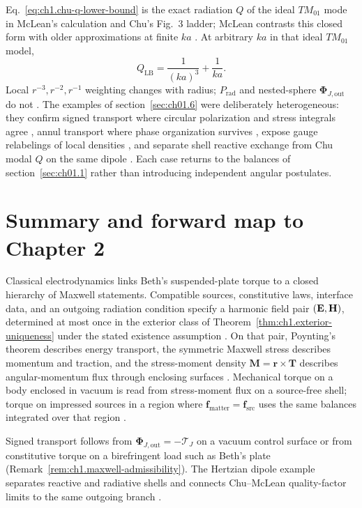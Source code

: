 Eq.~\eqref{eq:ch1.chu-q-lower-bound} is the exact radiation $Q$ of the ideal $TM_{01}$ mode in McLean's calculation and Chu's Fig.~3 ladder; McLean contrasts this closed form with older approximations at finite $ka$ \cite{mcclean1996,chu1948}. At arbitrary $ka$ in that ideal $TM_{01}$ model,
\begin{equation}
\label{eq:ch1.chu-q-lower-bound}
Q_{\mathrm{LB}}=\frac{1}{(ka)^3}+\frac{1}{ka}.
\end{equation}
Local $r^{-3},r^{-2},r^{-1}$ weighting changes with radius; $P_{\mathrm{rad}}$ and nested-sphere $\boldsymbol{\Phi}_{J,\mathrm{out}}$ do not \cite{poynting1884,stratton1941}. The examples of section~\ref{sec:ch01.6} were deliberately heterogeneous: they confirm signed transport where circular polarization and stress integrals agree \cite{beth1936}, annul transport where phase organization survives \cite{allen1992}, expose gauge relabelings of local densities \cite{belinfante1940}, and separate shell reactive exchange from Chu modal $Q$ on the same dipole \cite{chu1948,mcclean1996}. Each case returns to the balances of section~\ref{sec:ch01.1} rather than introducing independent angular postulates.

\section{Summary and forward map to Chapter 2}
\label{sec:ch01.7}

Classical electrodynamics links Beth's suspended-plate torque to a closed hierarchy of Maxwell statements. Compatible sources, constitutive laws, interface data, and an outgoing radiation condition specify a harmonic field pair $(\mathbf{E},\mathbf{H})$, determined at most once in the exterior class of Theorem~\ref{thm:ch1.exterior-uniqueness} under the stated existence assumption \cite{maxwell1873,stratton1941,sommerfeld1949}. On that pair, Poynting's theorem describes energy transport, the symmetric Maxwell stress describes momentum and traction, and the stress-moment density $\mathbf{M}=\mathbf{r}\times\mathbf{T}$ describes angular-momentum flux through enclosing surfaces \cite{poynting1884,beth1936,stratton1941}. Mechanical torque on a body enclosed in vacuum is read from stress-moment flux on a source-free shell; torque on impressed sources in a region where $\mathbf{f}_{\mathrm{matter}}=\mathbf{f}_{\mathrm{src}}$ uses the same balances integrated over that region \cite{harrington2001,stratton1941}.

Signed transport follows from $\boldsymbol{\Phi}_{J,\mathrm{out}}=-\boldsymbol{\mathcal{T}}_J$ on a vacuum control surface or from constitutive torque on a birefringent load such as Beth's plate (Remark~\ref{rem:ch1.maxwell-admissibility}). The Hertzian dipole example separates reactive and radiative shells and connects Chu--McLean quality-factor limits to the same outgoing branch \cite{chu1948,mcclean1996,stratton1941}.

